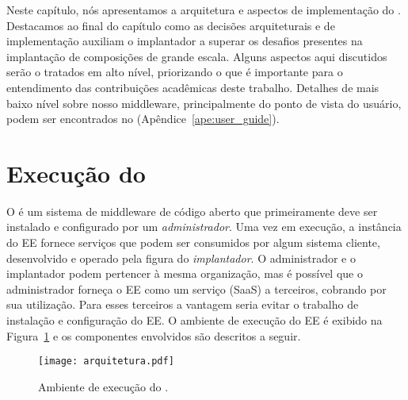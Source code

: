 Neste capítulo, nós apresentamos a arquitetura e aspectos de implementação do \ee.   
Destacamos ao final do capítulo
como as decisões arquiteturais e de implementação auxiliam o implantador
a superar os desafios presentes na implantação de composições de grande escala.
Alguns aspectos aqui discutidos serão o tratados em alto nível,
priorizando o que é importante para o entendimento das contribuições
acadêmicas deste trabalho.
Detalhes de mais baixo nível sobre nosso middleware, principalmente do ponto de vista do
usuário, podem ser encontrados no \userguide (Apêndice~\ref{ape:user_guide}).

\section{Execução do \ee}

O \ee é um sistema de middleware de código aberto que primeiramente deve ser instalado e configurado por um \emph{administrador}.
Uma vez em execução, a instância do EE fornece serviços que podem ser consumidos por algum sistema cliente, desenvolvido
e operado pela figura do \emph{implantador}. O administrador e o implantador podem pertencer à mesma organização,
mas é possível que o administrador forneça o EE como um serviço (SaaS) a terceiros, cobrando por sua utilização.
Para esses terceiros a vantagem seria evitar o trabalho de instalação e configuração do EE.
O ambiente de execução do EE é exibido na Figura~\ref{fig:arquitetura} e os componentes envolvidos são descritos a seguir.

\begin{figure}[ht]
\centering
\texttt{[image: arquitetura.pdf]}
\caption{Ambiente de execução do \choreos \ee.}
\label{fig:arquitetura}
\end{figure}

